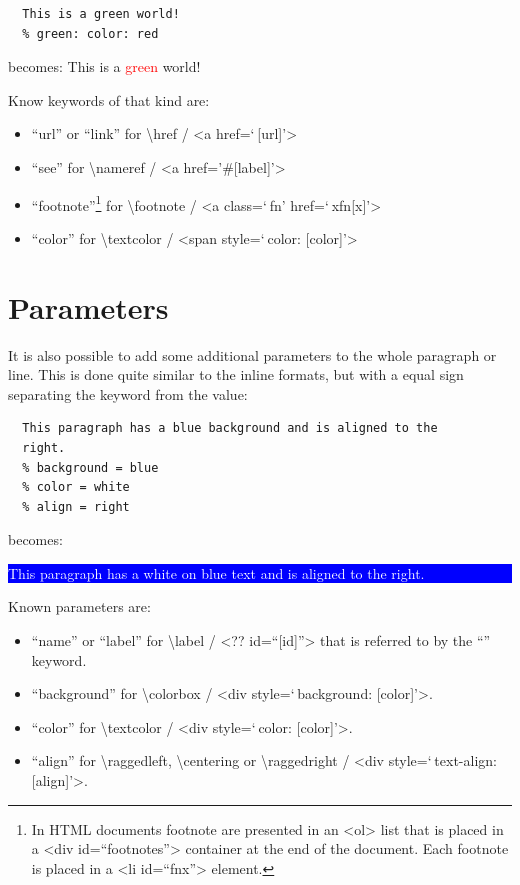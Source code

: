 \documentclass{article}
\begin{document}
\begin{verbatim}
  This is a green world!
  % green: color: red
\end{verbatim}


{becomes:
This is a \textcolor{red}{green} world!\\}

{Know keywords of that kind are:\\}

\begin{itemize}
\item “url” or “link” for \textbackslash href / <a href=‘ {[url]}’>
\item “see” for \textbackslash nameref / <a href='\#{[label]}’> 
\item “footnote”\footnote{In HTML documents footnote are presented in an <ol> list that is placed in a <div id=“footnotes”> container at the end of the document. Each footnote is placed in a <li id=“fnx”> element.}\xspace  for \textbackslash footnote / <a class=‘ fn’ href=‘ xfn{[x]}’>
\item “color” for \textbackslash textcolor / <span style=‘ color: {[color]}’>
\end{itemize}


\section{Parameters}

{It is also possible to add some additional parameters to the whole
paragraph or line. This is done quite similar to the inline
formats, but with a equal sign separating the keyword from
the value:\\}

\begin{verbatim}
  This paragraph has a blue background and is aligned to the
  right.
  % background = blue
  % color = white
  % align = right
\end{verbatim}


{becomes:\\}

\colorbox{blue}{\parbox{\linewidth}{%
{\raggedleft%
\textcolor{white}{%
This paragraph has a white on blue text and is aligned to the
right.}\\}
}
}

{Known parameters are:\\}

\begin{itemize}
\item “name” or “label” for \textbackslash label / <?? id=“{[id]}”> that is
  referred to by the “\xspace ” keyword.
\item “background” for \textbackslash colorbox / <div style=‘ background: {[color]}’>.
\item “color” for \textbackslash textcolor / <div style=‘ color: {[color]}’>.
\item “align” for \textbackslash raggedleft, \textbackslash centering or \textbackslash raggedright / <div
  style=‘ text-align: {[align]}’>.
\end{itemize}
\end{document}

